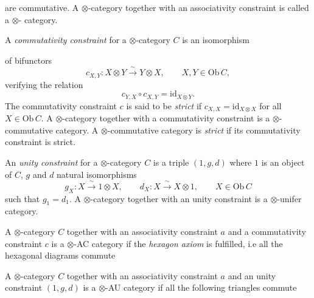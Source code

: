 \documentclass[11pt,a4paper]{article}
\begin{document}
are commutative. A $\otimes$-category together with an associativity
constraint is called a $\otimes$- category.

A \emph{commutativity constraint} for a $\otimes$-category $C$ is an
isomorphism

of bifunctors
\[
c_{X,Y} : X \otimes Y \xrightarrow{\ \sim\ } Y \otimes X, \qquad
X, Y \in \mathrm{Ob}\,C,
\]
verifying the relation
\[
c_{Y,X} \circ c_{X,Y} = \mathrm{id}_{X \otimes Y}.
\]
The commutativity constraint $c$ is said to be \emph{strict} if $c_{X,X} =
\mathrm{id}_{X \otimes X}$ for all $X \in \mathrm{Ob}\,C$. A
$\otimes$-category together with a commutativity constraint is a
$\otimes$-commutative category. A $\otimes$-commutative category is
\emph{strict} if its commutativity constraint is strict.

An \emph{unity constraint} for a $\otimes$-category $C$ is a triple $(1,
g, d)$ where $1$ is an object of $C$, $g$ and $d$ natural isomorphisms
\[
g_{X} : X \xrightarrow{\ \sim\ } 1 \otimes X, \qquad
d_{X} : X \xrightarrow{\ \sim\ } X \otimes 1, \qquad
X \in \mathrm{Ob}\,C
\]
such that $g_{1} = d_{1}$. A $\otimes$-category together with an unity
constraint is a $\otimes$-unifer category.

A $\otimes$-category $C$ together with an associativity constraint $a$
and a commutativity constraint $c$ is a $\otimes$-AC category if the
\emph{hexagon axiom} is fulfilled, i.e all the hexagonal diagrams commute


A $\otimes$-category $C$ together with an associativity constraint $a$ and
an unity constraint $(1, g, d)$ is a $\otimes$-AU category if all the
following triangles commute

\end{document}
